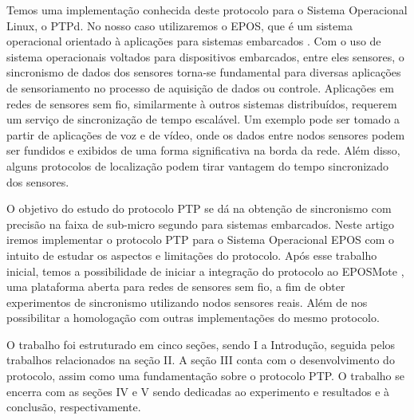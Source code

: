 		Temos uma implementação conhecida deste protocolo para o Sistema Operacional Linux, o PTPd. No nosso caso utilizaremos o EPOS, que é um sistema operacional orientado à aplicações para sistemas embarcados \cite{Guto}. Com o uso de sistema operacionais voltados para dispositivos embarcados, entre eles sensores, o sincronismo de dados dos sensores torna-se fundamental para diversas aplicações de sensoriamento no processo de aquisição de dados ou controle. Aplicações em redes de sensores sem fio, similarmente à outros sistemas distribuídos, requerem um serviço de sincronização de tempo escalável. Um exemplo pode ser tomado a partir de aplicações de voz e de vídeo, onde os dados entre nodos sensores podem ser fundidos e exibidos de uma forma significativa na borda da rede. Além disso, alguns protocolos de localização podem tirar vantagem do tempo sincronizado dos sensores.
		
		O objetivo do estudo do protocolo PTP se dá na obtenção de sincronismo com precisão na faixa de sub-micro segundo para sistemas embarcados. Neste artigo iremos implementar o protocolo PTP para o Sistema Operacional EPOS com o intuito de estudar os aspectos e limitações do protocolo. Após esse trabalho inicial, temos a possibilidade de iniciar a integração do protocolo ao EPOSMote \cite{Mote}, uma plataforma aberta para redes de sensores sem fio, a fim de obter experimentos de sincronismo utilizando nodos sensores reais. Além de nos possibilitar a homologação com outras implementações do mesmo protocolo. 
		
		O trabalho foi estruturado em cinco seções, sendo I a Introdução, seguida pelos trabalhos relacionados na seção II. A seção III conta com o desenvolvimento do protocolo, assim como uma fundamentação sobre o protocolo PTP. O trabalho se encerra com as seções IV e V sendo dedicadas ao experimento e resultados e à conclusão, respectivamente.
	 






